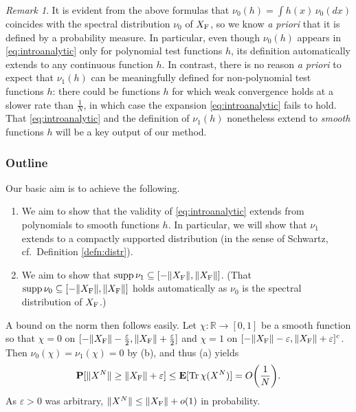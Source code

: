 \documentclass[10pt,reqno]{amsart}
\theoremstyle{definition}
\theoremstyle{remark}
\newtheorem{rem}[thm]{Remark}
\numberwithin{equation}{section}
\numberwithin{figure}{section}
\numberwithin{table}{section}
\newcommand{\supp}{\mathop{\mathrm{supp}}}
\newcommand{\tr}{\mathop{\mathrm{Tr}}}
\newcommand{\EE}{\mathbf{E}}
\begin{document}
\begin{rem}
\label{rem:extensionisnontrivial}
It is evident from the above formulas that $\nu_0(h)=\int h(x)\,\nu_0(dx)$ 
coincides with the spectral distribution $\nu_0$ of $X_{\rm F}$, so we 
know \emph{a priori} that it is defined by a probability measure. In 
particular, even though $\nu_0(h)$ appears in \eqref{eq:introanalytic} 
only for polynomial test functions $h$, its definition automatically 
extends to any continuous function $h$. In contrast, there is no reason 
\emph{a priori} to expect that $\nu_1(h)$ can be meaningfully defined
for non-polynomial test functions $h$: there could be
functions $h$ for which weak convergence holds at a slower rate than 
$\frac{1}{N}$, in which case the expansion \eqref{eq:introanalytic} 
fails to hold. 
That \eqref{eq:introanalytic} and the definition of
$\nu_1(h)$ nonetheless extend to 
\emph{smooth} functions $h$ will be a key output of our method. 
\end{rem}

\subsubsection*{\bf Outline}

Our basic aim is to achieve the following.\vspace*{.05cm}
\begin{enumerate}[leftmargin=*,label=\!\!(\alph*)\!]
\addtolength{\itemsep}{.2cm}
\item We aim to show that the validity of \eqref{eq:introanalytic} 
extends from polynomials to smooth functions $h$. In particular,
we will show that $\nu_1$ extends to a compactly supported distribution
(in the sense of Schwartz, cf.\ Definition \ref{defn:distr}).
\item We aim to show that $\supp \nu_1 \subseteq [-\|X_{\rm F}\|,\|X_{\rm 
F}\|]$. \!(That $\supp \nu_0 \subseteq [-\|X_{\rm F}\|,\|X_{\rm
F}\|]$ holds automatically as $\nu_0$ is the spectral distribution of
$X_{\rm F}$.)
\end{enumerate}
\vspace*{.05cm}
A bound on the norm then
follows easily. Let $\chi:\mathbb{R}\to[0,1]$ be a smooth function 
so that $\chi=0$ on $[-\|X_{\rm F}\|-\frac{\varepsilon}{2},\|X_{\rm 
F}\|+\frac{\varepsilon}{2}]$ 
and $\chi=1$
on $[-\|X_{\rm F}\|-\varepsilon,\|X_{\rm F}\|+\varepsilon]^c$.
Then $\nu_0(\chi)=\nu_1(\chi)=0$ by (b), and thus (a) yields
$$
	\mathbf{P}[\|X^N\|\ge \|X_{\rm F}\|+\varepsilon] \le 
	\EE[\tr \chi(X^N)]=O\bigg(\frac{1}{N}\bigg).
$$
As $\varepsilon>0$ was arbitrary,
$\|X^N\|\le \|X_{\rm F}\|+o(1)$ in probability.
\end{document}
